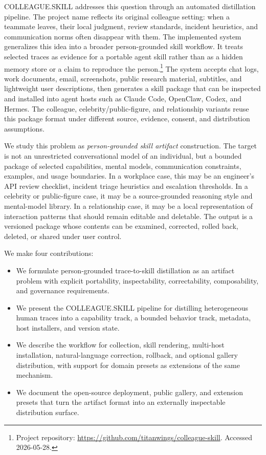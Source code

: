 \documentclass{llmxive}
\providecommand{\system}{\textsc{COLLEAGUE.SKILL}\xspace}
\begin{document}
\system addresses this question through an automated distillation pipeline. The project name reflects its original colleague setting: when a teammate leaves, their local judgment, review standards, incident heuristics, and communication norms often disappear with them. The implemented system generalizes this idea into a broader person-grounded skill workflow. It treats selected traces as evidence for a portable agent skill rather than as a hidden memory store or a claim to reproduce the person.\footnote{Project repository: \url{https://github.com/titanwings/colleague-skill}. Accessed 2026-05-28.} The system accepts chat logs, work documents, email, screenshots, public research material, subtitles, and lightweight user descriptions, then generates a skill package that can be inspected and installed into agent hosts such as Claude Code, OpenClaw, Codex, and Hermes. The colleague, celebrity/public-figure, and relationship variants reuse this package format under different source, evidence, consent, and distribution assumptions.

We study this problem as \emph{person-grounded skill artifact} construction. The target is not an unrestricted conversational model of an individual, but a bounded package of selected capabilities, mental models, communication constraints, examples, and usage boundaries. In a workplace case, this may be an engineer's API review checklist, incident triage heuristics and escalation thresholds. In a celebrity or public-figure case, it may be a source-grounded reasoning style and mental-model library. In a relationship case, it may be a local representation of interaction patterns that should remain editable and deletable. The output is a versioned package whose contents can be examined, corrected, rolled back, deleted, or shared under user control.

We make four contributions:
\begin{itemize}
  \item We formulate person-grounded trace-to-skill distillation as an artifact problem with explicit portability, inspectability, correctability, composability, and governance requirements.
  \item We present the \system pipeline for distilling heterogeneous human traces into a capability track, a bounded behavior track, metadata, host installers, and version state.
  \item We describe the workflow for collection, skill rendering, multi-host installation, natural-language correction, rollback, and optional gallery distribution, with support for domain presets as extensions of the same mechanism.
  \item We document the open-source deployment, public gallery, and extension presets that turn the artifact format into an externally inspectable distribution surface.
\end{itemize}
\end{document}
